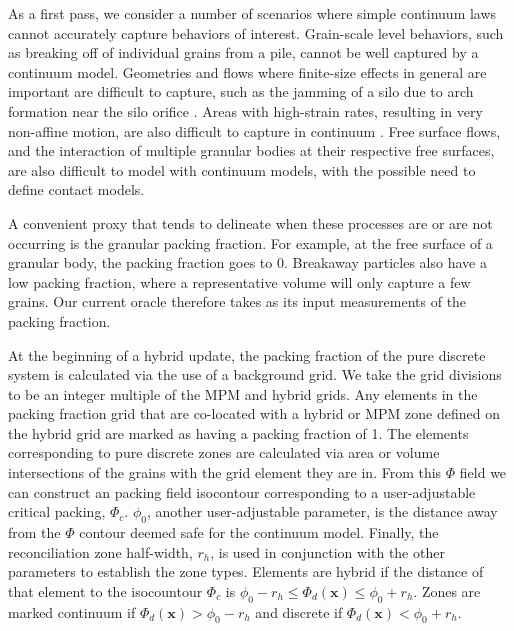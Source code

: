 As a first pass, we consider a number of scenarios where simple continuum laws cannot accurately capture behaviors of interest. Grain-scale level behaviors, such as breaking off of individual grains from a pile, cannot be well captured by a continuum model. Geometries and flows where finite-size effects in general are important are difficult to capture, such as the jamming of a silo due to arch formation near the silo orifice \cite{Beverloo:1961:Flow,Midi:2004:Dense,Pouliquen:1999:Scaling,Sheldon:2010:Granular}. Areas with high-strain rates, resulting in very non-affine motion, are also difficult to capture in continuum \cite{Dijksman:2010:Granular,Kamrin:2010,Koval:2009:Annular}. Free surface flows, and the interaction of multiple granular bodies at their respective free surfaces, are also difficult to model with continuum models, with the possible need to define contact models.

A convenient proxy that tends to delineate when these processes are or are not occurring is the granular packing fraction. For example, at the free surface of a granular body, the packing fraction goes to 0. Breakaway particles also have a low packing fraction, where a representative volume will only capture a few grains. Our current oracle therefore takes as its input measurements of the packing fraction.

At the beginning of a hybrid update, the packing fraction of the pure discrete system is calculated via the use of a background grid. We take the grid divisions to be an integer multiple of the MPM and hybrid grids. Any elements in the packing fraction grid that are co-located with a hybrid or MPM zone defined on the hybrid grid are marked as having a packing fraction of 1. The elements corresponding to pure discrete zones are calculated via area or volume intersections of the grains with the grid element they are in. From this $\Phi$ field  we can construct an packing field isocontour corresponding to a user-adjustable critical packing, $\Phi_c$. $\phi_0$, another user-adjustable parameter, is the distance away from the $\Phi$ contour deemed safe for the continuum model. Finally, the reconciliation zone half-width, $r_h$, is used in conjunction with the other parameters to establish the zone types. Elements are hybrid if the distance of that element to the isocountour $\Phi_c$ is  
$\phi_0 - r_h \leq \Phi_d(\bm{x}) \leq \phi_0 + r_h$. Zones are marked continuum if $\Phi_d(\bm{x}) > \phi_0 - r_h$ and discrete if $\Phi_d(\bm{x}) < \phi_0 + r_h$.


